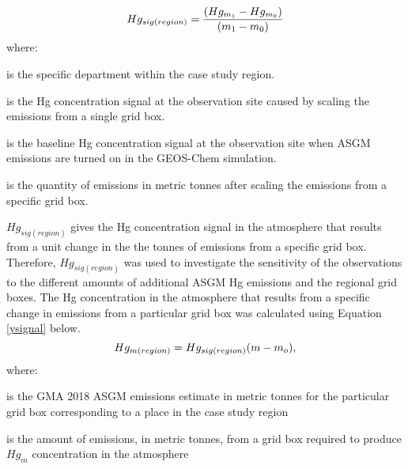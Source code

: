 \begin{flushleft}
\begin{equation}
\label{doublingSig}
Hg_{sig(region)}=\small\frac{(Hg_{m_1} -Hg_{m_0})}{(m_1 -m_0)}
\end{equation}
where:
\end{flushleft}

\begin{description}[leftmargin=!,labelwidth={3 em}]
    \item [$region$] is the specific department within the case study region.
    \item [$Hg_{m_1}$] is the Hg concentration signal at the observation site caused by scaling the emissions from a single grid box. 
    \item [$Hg_{m_0}$] is the baseline Hg concentration signal at the observation site when ASGM emissions are turned on in the GEOS-Chem simulation.
    \item [$m_1$] is the quantity of emissions in metric tonnes after scaling the emissions from a specific grid box.
\end{description}


\begin{flushleft}
$Hg_{sig(region)}$ gives the Hg concentration signal in the atmosphere that results from a unit change in the the tonnes of emissions from a specific grid box. Therefore, $Hg_{sig(region)}$ was used to investigate the sensitivity of the observations to the different amounts of additional ASGM Hg emissions and the regional grid boxes. The Hg concentration in the atmosphere that results from a specific change in emissions from a particular grid box was calculated using Equation \ref{ysignal} below.
\begin{equation}
\label{ysignal}
\small{Hg_{m(region)}} =Hg_{sig(region)}(m-m_o), 
\end{equation}
where:
\end{flushleft}


\begin{description}[leftmargin=!,labelwidth={1.5 em}]
    
    \item [$m_0$] is the GMA 2018 ASGM emissions estimate in metric tonnes for the particular grid box corresponding to a place in the case study region
    
    \item [$m$] is the amount of emissions, in metric tonnes, from a grid box required to produce $Hg_{m}$ concentration in the atmosphere
\end{description}

